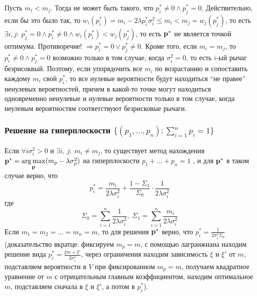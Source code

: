 Пусть $m_i < m_j$. Тогда не может быть такого, что $p_i^* \neq 0 \land p_j^* = 0$. Действительно, если бы это было так, то $w_i(p_i^*) = m_i - 2 \lambda p_i^* \sigma_i^2 \leq m_i < m_j = w_j(p_j^*)$, то есть $\exists i,j: \: p_j^* = 0 \land p_i^* \neq 0 \land w_i(p_i^*) <  w_j(p_j^*)$, то есть $\textbf{p}^*$ не является точкой оптимума. Противоречие! $\Rightarrow p_i^* = 0 \lor p_j^* \neq 0$. Кроме того, если $m_i = m_j$, то $p_i^* \neq 0 \land p_j^* = 0$ возможно только в том случае, когда $\sigma_i^2 = 0$, то есть $i$-ый рычаг безрисоквый. Поэтому, если упорядочить все $m_i$ по возрастанию и сопоставить каждому $m_i$ свой $p_i^*$, то все нулевые вероятности будут находиться ``не правее'' ненулевых вероятностей, причем в какой-то точке могут находиться одновременно ненулевые и нулевые вероятности только в том случае, когда неулевым вероятностям соответствуют безрисковые рычаги.

\subsubsection{Решение на гиперплоскости $\{(p_1, ..., p_n) : \sum_{i=1}^n p_i = 1 \}$}
\label{subsec:theory_solution_outside_simplex}

Если $\forall i \sigma_i^2 > 0$ и $\exists i,\, j: \: m_i \neq m_j$, то существует метод нахождения $\textbf{p}^* = \underset{\textbf{p}}{\arg \max} (m_p - \lambda \sigma_p^2)$ на гиперплоскости $p_1 + ... + p_n = 1$ \cite{bouchaudpotters}, и для $\textbf{p}^*$ в таком случае верно, что 
\[
p_i^* = \frac{m_i}{2\lambda \sigma_i^2} + \frac{1 - \Sigma_1}{\Sigma_0} \cdot \frac{1}{2 \lambda \sigma_i^2}
\]
где
\[
\Sigma_0 = \sum_{i=1}^n \frac{1}{2 \lambda \sigma_i^2}, \; \Sigma_1 = \sum_{i=1}^n \frac{m_i}{2 \lambda \sigma_i^2}
\]
Если $m_1 = m_2 = ... = m_n = m$, то для решения $\textbf{p}^*$ верно, что $p_i^* = \frac{1}{2\sigma_i^2 \Sigma_0}$ (доказательство вкратце: фиксируем $m_p = m$, с помощью лагранжиана находим решение вида $p_i^* = \frac{\xi m + \xi'}{2\sigma_i^2}$, через ограничения находим зависимость $\xi$ и $\xi'$ от $m$, подставляем вероятности в $V$ при фиксированном $m_p = m$, получаем квадратное уравнение от $m$ с отрицательным главным коэффициентом, находим оптимальное $m$, подставляем сначала в $\xi$ и $\xi'$, а потом в $p_i^*$).\

